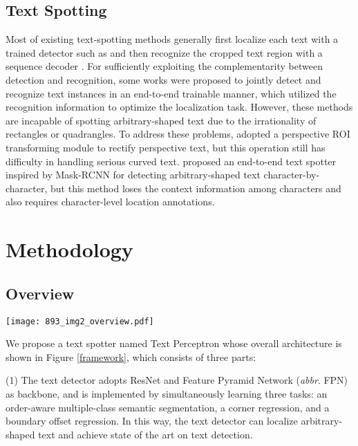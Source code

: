 \documentclass[letterpaper]{article} \usepackage{aaai20}  \usepackage{times}  \usepackage{helvet} \usepackage{courier}  \usepackage[hyphens]{url}  \usepackage{graphicx} \urlstyle{rm} \def\UrlFont{\rm}  \usepackage{graphicx}  \frenchspacing  \setlength{\pdfpagewidth}{8.5in}  \setlength{\pdfpageheight}{11in}  \usepackage{amsmath}
\begin{document}
\subsection{Text Spotting}
Most of existing text-spotting methods \cite{liao2018textboxess,liao2017textboxes,wang2012end}  generally first localize each text with a trained detector such as \cite{zhou2017east} and then recognize the cropped text region with a sequence decoder \cite{shi2017end}.
For sufficiently exploiting the complementarity between detection and recognition, some works \cite{he2018end,li2017towards,liu2018fots} were proposed to jointly detect and recognize text instances in an end-to-end trainable manner, which utilized the recognition information to optimize the localization task.
However, these methods are incapable of spotting arbitrary-shaped text due to the irrationality of rectangles or quadrangles.
To address these problems, \cite{sun2018textnet} adopted a perspective ROI transforming module to rectify perspective text, but this operation still has difficulty in handling serious curved text.
\cite{lyu2018mask} proposed an end-to-end text spotter inspired by Mask-RCNN for detecting arbitrary-shaped text character-by-character, but this method loses the context information among characters and also requires character-level location annotations.


\section{Methodology}
\subsection{Overview}
\begin{figure*}[ht]
\centering
\texttt{[image: 893\_img2\_overview.pdf]}\\
\caption{The workflow of Text Perceptron. The black and red arrows separately mean the forward and backward process.}
\label{framework}
\end{figure*}

We propose a text spotter named Text Perceptron whose overall architecture is shown in Figure \ref{framework}, which consists of three parts:

(1) The text detector adopts ResNet \cite{he2016deep} and Feature Pyramid Network (\emph{abbr}. FPN) \cite{lin2017feature} as backbone, and is implemented by simultaneously learning three tasks: an order-aware multiple-class semantic segmentation, a corner regression, and a boundary offset regression. In this way, the text detector can localize arbitrary-shaped text and achieve state of the art on text detection.
\end{document}
